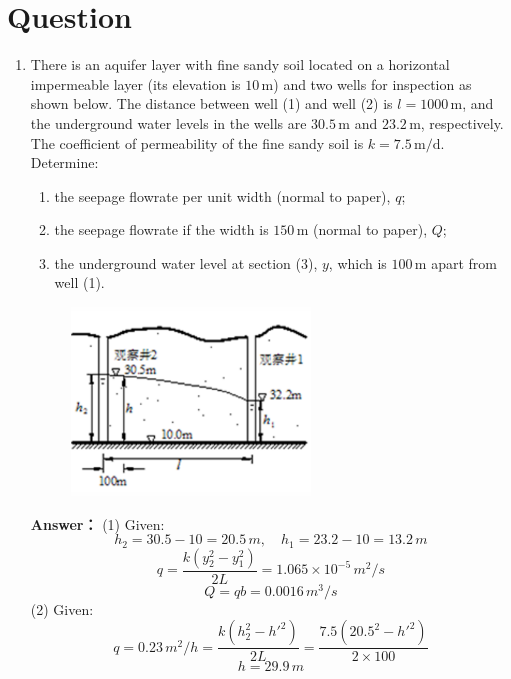 \documentclass[12pt,a4paper]{article}
\newcounter{question}
\newenvironment{questions}{
    \setcounter{question}{0}
    \section*{Question}
    \begin{enumerate}[leftmargin=1.5em,label={\arabic*．}]
}{
    \end{enumerate}
}
\newcommand{\answer}[1]{\par\noindent\textbf{Answer：} #1\par\vspace{1em}}
\begin{document}
\begin{questions}
{{Therefore:
\[
S_f = \frac{dy}{dx}
\]
\[
v = k \frac{dh}{dx}, \quad q = k y \frac{dy}{dx}
\]
Integrating gives:
\[
q L = k \frac{(y_2^2 - y_1^2)}{2}
\]
Rearranging:
\[
\frac{2 q}{k} l = y_1^2 - y_2^2
\]

}
}

\item There is an aquifer layer with fine sandy soil located on a horizontal impermeable layer (its elevation is $10\,\mathrm{m}$) and two wells for inspection as shown below. The distance between well (1) and well (2) is $l = 1000\,\mathrm{m}$, and the underground water levels in the wells are $30.5\,\mathrm{m}$ and $23.2\,\mathrm{m}$, respectively. The coefficient of permeability of the fine sandy soil is $k = 7.5\,\mathrm{m/d}$. Determine:
  
\begin{enumerate}
    \item the seepage flowrate per unit width (normal to paper), $q$;
    \item the seepage flowrate if the width is $150\,\mathrm{m}$ (normal to paper), $Q$;
    \item the underground water level at section (3), $y$, which is $100\,\mathrm{m}$ apart from well (1).
  \end{enumerate}

\begin{figure}[H]
\centering
\includegraphics[width=0.6\textwidth]{./figures/36.png}
\end{figure}

\answer{
(1) Given:
\[
h_2 = 30.5 - 10 = 20.5 \, m, \quad h_1 = 23.2 - 10 = 13.2 \, m
\]
\[
q = \frac{k (y_2^2 - y_1^2)}{2L} = 1.065 \times 10^{-5} \, m^2/s
\]
\[
Q = q b = 0.0016 \, m^3/s
\]
(2) Given:
\[
q = 0.23 \, m^2 / h = \frac{k(h_2^2 - h'^2)}{2L} = \frac{7.5 (20.5^2 - h'^2)}{2 \times 100}
\]
\[
h = 29.9 \, m
\]


}

\end{questions}

\newpage

\end{document}
